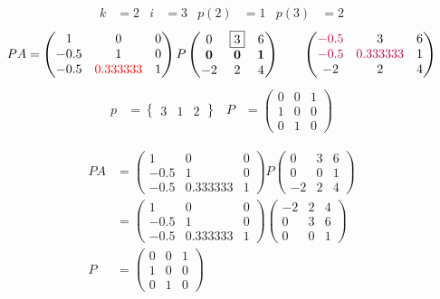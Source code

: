 \documentclass[pdf]{beamer}
\begin{document}
\begin{frame}{}\begin{align*} k &= 2 & i &= 3 & p(2) &= 1 & p(3) &= 2\end{align*}$$PA=\begin{pmatrix}1&0&0\\-0.5&1&0\\-0.5&{\color{red}0.333333}&1\end{pmatrix} P \begin{pmatrix}0&\boxed{3}&6\\\mathbf{0}&\mathbf{0}&\mathbf{1}\\-2&2&4\end{pmatrix} \quad\quad \begin{pmatrix}{\color{purple}-0.5}&3&6\\{\color{purple}-0.5}&{\color{purple}0.333333}&1\\-2&2&4\end{pmatrix}$$\begin{align*} p&= \begin{Bmatrix}3&1&2\end{Bmatrix} & P&= \begin{pmatrix}0&0&1\\1&0&0\\0&1&0\end{pmatrix} \end{align*}\end{frame}
\begin{frame}{}\begin{align*}PA&=\begin{pmatrix}1&0&0\\-0.5&1&0\\-0.5&0.333333&1\end{pmatrix} P \begin{pmatrix}0&3&6\\0&0&1\\-2&2&4\end{pmatrix}\\&= \begin{pmatrix}1&0&0\\-0.5&1&0\\-0.5&0.333333&1\end{pmatrix} \begin{pmatrix}-2&2&4\\0&3&6\\0&0&1\end{pmatrix} \\ P&= \begin{pmatrix}0&0&1\\1&0&0\\0&1&0\end{pmatrix}\end{align*}
\end{frame}
\end{document}
